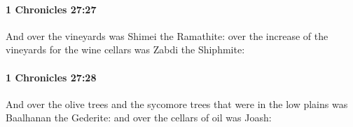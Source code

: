 		\paragraph{1 Chronicles 27:27} %
			\label{1CHRONICLES-27-27}

			And over the vineyards was Shimei the Ramathite: over the increase of the vineyards for the wine cellars was Zabdi the Shiphmite:


		\paragraph{1 Chronicles 27:28} %
			\label{1CHRONICLES-27-28}

			And over the olive trees and the sycomore trees that were in the low plains was Baalhanan the Gederite: and over the cellars of oil was Joash:


